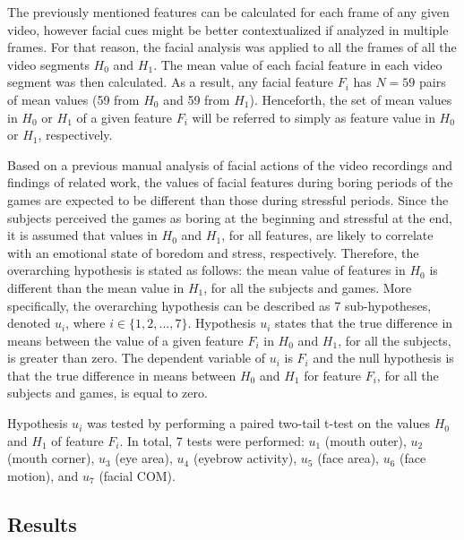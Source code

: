The previously mentioned features can be calculated for each frame of any given video, however facial cues might be better contextualized if analyzed in multiple frames. For that reason, the facial analysis was applied to all the frames of all the video segments $H_0$ and $H_1$. The mean value of each facial feature in each video segment was then calculated. As a result, any facial feature $F_i$ has $N=59$ pairs of mean values (59 from $H_0$ and 59 from $H_1$). Henceforth, the set of mean values in $H_0$ or $H_1$ of a given feature $F_i$ will be referred to simply as feature value in $H_0$ or $H_1$, respectively.

Based on a previous manual analysis of facial actions of the video recordings \parencite{bevilacqua2016variations} and findings of related work, the values of facial features during boring periods of the games are expected to be different than those during stressful periods. Since the subjects perceived the games as boring at the beginning and stressful at the end, it is assumed that values in $H_0$ and $H_1$, for all features, are likely to correlate with an emotional state of boredom and stress, respectively. Therefore, the overarching hypothesis is stated as follows: the mean value of features in $H_0$ is different than the mean value in $H_1$, for all the subjects and games. More specifically, the overarching hypothesis can be described as 7 sub-hypotheses, denoted $u_i$, where $i \in \{1, 2, ..., 7\}$. Hypothesis $u_i$ states that the true difference in means between the value of a given feature $F_i$ in $H_0$ and $H_1$, for all the subjects, is greater than zero. The dependent variable of $u_i$ is $F_i$ and the null hypothesis is that the true difference in means between $H_0$ and $H_1$ for feature $F_i$, for all the subjects and games, is equal to zero.

Hypothesis $u_i$ was tested by performing a paired two-tail t-test on the values $H_0$ and $H_1$ of feature $F_i$. In total, 7 tests were performed: $u_1$ (mouth outer), $u_2$ (mouth corner), $u_3$ (eye area), $u_4$ (eyebrow activity), $u_5$ (face area), $u_6$ (face motion), and $u_7$ (facial COM).

\subsection{Results}

